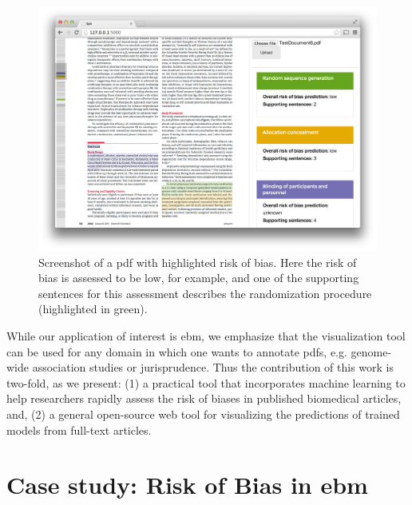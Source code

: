 \documentclass[runningheads,a4paper]{llncs}
\begin{document}
\begin{figure}[htb]
\vspace{-2em}
\centering
\includegraphics[width=0.8\linewidth]{./images/screenshot2.png}
\vspace{-1em}
\caption{\label{fig:screenshot}Screenshot of a \ac{pdf} with highlighted risk of bias. Here the risk of bias is assessed to be low, for example, and one of the supporting sentences for this assessment describes the randomization procedure (highlighted in green).}
\vspace{-1.5em}
\end{figure}

While our application of interest is \ac{ebm}, we emphasize that the visualization tool can be used for any domain in which one wants to annotate \acp{pdf}, e.g. genome-wide association studies or jurisprudence.
Thus the contribution of this work is two-fold, as we present:
(1) a practical tool that incorporates machine learning to help researchers rapidly assess the risk of biases in published biomedical articles, and,
(2) a general open-source web tool for visualizing the predictions of trained models from full-text articles.

\section{Case study: Risk of Bias in \acl{ebm}}
\label{section:EBM-ML}
\end{document}
